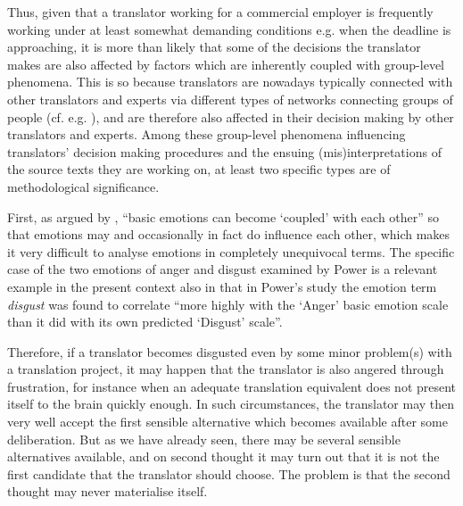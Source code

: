 \documentclass[output=paper]{LSP/langsci}
\begin{document}
Thus, given that a translator working for a commercial employer is frequently working under at least somewhat demanding conditions e.g. when the deadline is approaching, it is more than likely that some of the decisions the translator makes are also affected by factors which are inherently coupled with group-level phenomena. This is so because translators are nowadays typically connected with other translators and experts via different types of networks connecting groups of people (cf. e.g. \citealt{Tyulenev2014}), and are therefore also affected in their decision making by other translators and experts. Among these group-level phenomena influencing translators' decision making procedures and the ensuing (mis)interpretations of the source texts they are working on, at least two specific types are of methodological significance.

First, as argued by \citet[710]{Power2006}, ``basic emotions can become `coupled' with each other'' so that emotions may and occasionally in fact do influence each other, which makes it very difficult to analyse emotions in completely unequivocal terms. The specific case of the two emotions of anger and disgust examined by Power is a relevant example in the present context also in that in Power's study the emotion term \textit{disgust} was found to correlate ``more highly with the `Anger' basic emotion scale than it did with its own predicted `Disgust' scale''.

Therefore, if a translator becomes disgusted even by some minor problem(s) with a translation project, it may happen that the translator is also angered through frustration, for instance when an adequate translation equivalent does not present itself to the brain quickly enough. In such circumstances, the translator may then very well accept the first sensible alternative which becomes available after some deliberation. But as we have already seen, there may be several sensible alternatives available, and on second thought it may turn out that it is not the first candidate that the translator should choose. The problem is that the second thought may never materialise itself.
\end{document}
